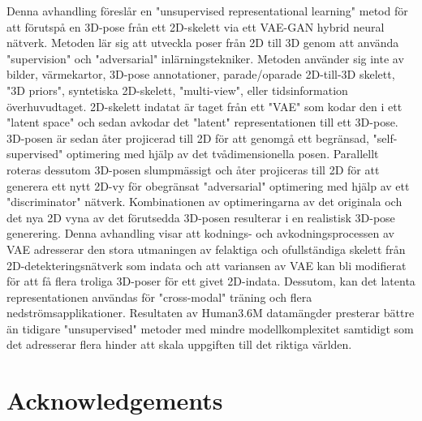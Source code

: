 Denna avhandling föreslår en "unsupervised representational learning" metod för att förutspå en 3D-pose från ett 2D-skelett via ett VAE-GAN hybrid neural nätverk. Metoden lär sig att utveckla poser från 2D till 3D genom att använda "supervision" och "adversarial" inlärningstekniker. Metoden använder sig inte av bilder, värmekartor, 3D-pose annotationer, parade/oparade 2D-till-3D skelett, "3D priors", syntetiska 2D-skelett, "multi-view", eller tidsinformation överhuvudtaget. 2D-skelett indatat är taget från ett "VAE" som kodar den i ett "latent space" och sedan avkodar det "latent" representationen till ett 3D-pose. 3D-posen är sedan åter projicerad till 2D för att genomgå ett begränsad, "self-supervised" optimering med hjälp av det tvådimensionella posen. Parallellt roteras dessutom 3D-posen slumpmässigt och åter projiceras till 2D för att generera ett nytt 2D-vy för obegränsat "adversarial" optimering med hjälp av ett "discriminator" nätverk. Kombinationen av optimeringarna av det originala och det nya 2D vyna av det förutsedda 3D-posen resulterar i en realistisk 3D-pose generering. Denna avhandling visar att kodnings- och avkodningsprocessen av VAE adresserar den stora utmaningen av felaktiga och ofullständiga skelett från 2D-detekteringsnätverk som indata och att variansen av VAE kan bli modifierat för att få flera troliga 3D-poser för ett givet 2D-indata. Dessutom, kan det latenta representationen användas för "cross-modal" träning och flera nedströmsapplikationer. Resultaten av Human3.6M datamängder presterar bättre än tidigare "unsupervised" metoder med mindre modellkomplexitet samtidigt som det adresserar flera hinder att skala uppgiften till det riktiga världen.



\newpage
\thispagestyle{plain}
\chapter*{Acknowledgements}


